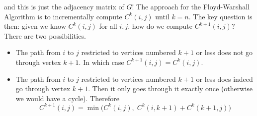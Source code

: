 and this is just the adjacency matrix of $G$! The approach for
the Floyd-Warshall Algorithm is to incrementally compute 
$C^k(i, j)$ until $k = n$. The key question is then: given we know
$C^k(i, j)$ for all $i, j$, how do we compute $C^{k + 1}(i, j)$?
There are two possibilities.

\begin{itemize}
    \item The path from $i$ to $j$ restricted to vertices numbered $k
    + 1$ or less does not go through vertex $k + 1$. In which case
    $C^{k + 1}(i, j) = C^k(i, j)$.
    \item The path from $i$ to $j$ restricted to vertices numbered $k
    + 1$ or less does indeed go through vertex $k + 1$. Then it only
    goes through it exactly once (otherwise we would have a cycle).
    Therefore 
    $$
    C^{k + 1}(i, j) = \min \Big (C^k(i, j), \; C^k(i, k + 1) + C^k(k +
    1,
    j) \Big )
    $$
\end{itemize}












